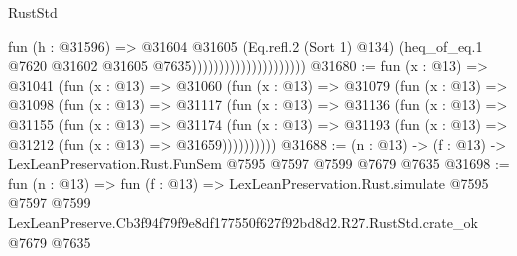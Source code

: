 \begin{lexlean}{RustStd}
\begin{coremodule}
                                          fun (h : @31596) =>
                                          @31604
                                            @31605
                                            (Eq.refl.{2} (Sort 1) @134)
                                            (heq_of_eq.{1}
                                              @7620
                                              @31602
                                              @31605
                                              @7635)))))))))))))))))))))
@31680 := fun (x : @13) =>
  @31041
    (fun (x : @13) =>
    @31060
      (fun (x : @13) =>
      @31079
        (fun (x : @13) =>
        @31098
          (fun (x : @13) =>
          @31117
            (fun (x : @13) =>
            @31136
              (fun (x : @13) =>
              @31155
                (fun (x : @13) =>
                @31174
                  (fun (x : @13) =>
                  @31193 (fun (x : @13) => @31212 (fun (x : @13) => @31659))))))))))
@31688 := (n : @13) -> (f : @13) -> LexLeanPreservation.Rust.FunSem @7595 @7597 @7599 @7679 @7635
@31698 := fun (n : @13) =>
  fun (f : @13) =>
  LexLeanPreservation.Rust.simulate
    @7595
    @7597
    @7599
    LexLeanPreserve.Cb3f94f79f9e8df177550f627f92bd8d2.R27.RustStd.crate_ok
    @7679
    @7635
\end{coremodule}
\end{lexlean}
